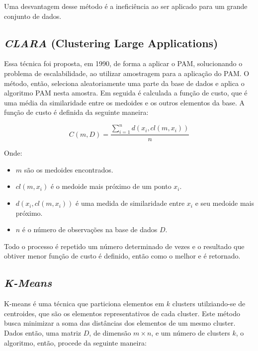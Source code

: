\documentclass[12pt,a4paper,header]{abnt}
\begin{document}
Uma desvantagem desse método é a ineficiência ao ser aplicado para um grande conjunto de dados\cite{park2009simple}.

\subsection{\textit{CLARA} (Clustering Large Applications)}

Essa técnica foi proposta, em 1990, de forma a aplicar o PAM, solucionando o problema de escalabilidade, ao utilizar amostragem para a aplicação do PAM\cite{park2009simple}. O método, então, seleciona aleatoriamente uma parte da base de dados e aplica o algoritmo PAM nesta amostra. Em seguida é calculada a função de custo, que é uma média da similaridade entre os medoides e os outros elementos da base\cite{bhat2014k}. A função de custo é definida da seguinte maneira:

\begin{equation}
C(m, D) = \frac{\sum_{i=1}^{n}{d(x_i, cl(m, x_i))}}{n}
\end{equation}

Onde:

\begin{itemize}

\item{$m$ são os medoides encontrados.}
\item{$cl(m,  x_i)$ é o medoide mais próximo de um ponto $x_i$.}
\item{$d(x_i, cl(m, x_i))$ é uma medida de similaridade entre $x_i$ e seu medoide mais próximo.}
\item{$n$ é o número de observações na base de dados $D$.}

\end{itemize}

Todo o processo é repetido um número determinado de vezes e o resultado que obtiver menor função de custo é definido, então como o melhor e é retornado\cite{bhat2014k}.

\subsection{\textit{K-Means}}

K-means é uma técnica que particiona elementos em $k$ clusters utilziando-se de centroides, que são os elementos representativos de cada cluster. Este método busca minimizar a soma das distâncias dos elementos de um mesmo cluster. Dados então, uma matriz $D$, de dimensão $m \times n$, e um número de clusters $k$, o algoritmo, então, procede da seguinte maneira\cite{mining2006data}:
\end{document}
